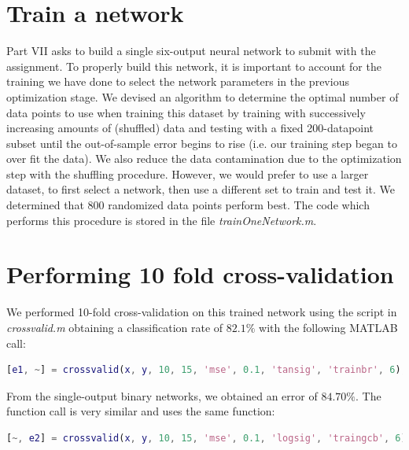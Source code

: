 \documentclass[a4paper,12pt,oneside,final]{report}
\newenvironment{changemargin}[2]{\begin{list}{}{%
\setlength{\topsep}{0pt}%
\setlength{\leftmargin}{0pt}%
\setlength{\rightmargin}{0pt}%
\setlength{\listparindent}{\parindent}%
\setlength{\itemindent}{\parindent}%
\setlength{\parsep}{0pt plus 1pt}%
\addtolength{\leftmargin}{#1}%
\addtolength{\rightmargin}{#2}%
}\item }{\end{list}}
\begin{document}
\section{Train a network}
Part VII asks to build a single six-output neural network to submit with the assignment.  To properly build this network, it is important to account for the training we have done to select the network parameters in the previous optimization stage.  We devised an algorithm to determine the optimal number of data points to use when training this dataset by training with successively increasing amounts of (shuffled) data and testing with a fixed 200-datapoint subset until the out-of-sample error begins to rise (i.e. our training step began to over fit the data).  We also reduce the data contamination due to the optimization step with the shuffling procedure.  However, we would prefer to use a larger dataset, to first select a network, then use a different set to train and test it.  We determined that 800 randomized data points perform best.  The code which performs this procedure is stored in the file \textit{trainOneNetwork.m}.


\section{Performing 10 fold cross-validation}
We performed 10-fold cross-validation on this trained network using the script in \textit{crossvalid.m} obtaining a classification rate of $82.1\%$ with the following MATLAB call:
\begin{changemargin}{-5mm}{-5mm}
\begin{lstlisting}[language=Matlab, frame=single]		
[e1, ~] = crossvalid(x, y, 10, 15, 'mse', 0.1, 'tansig', 'trainbr', 6);
\end{lstlisting}
\end{changemargin}
From the single-output binary networks, we obtained an error of $84.70\%$.  The function call is very similar and uses the same function:
\begin{changemargin}{-5mm}{-5mm}
\begin{lstlisting}[language=Matlab, frame=single]		
[~, e2] = crossvalid(x, y, 10, 15, 'mse', 0.1, 'logsig', 'traingcb', 6);
\end{lstlisting}
\end{changemargin}
\end{document}
